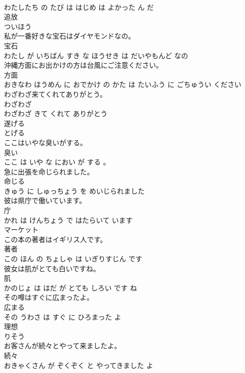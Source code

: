 \documentclass[8pt]{extreport}
\begin{document}
\begin{CJK}{UTF8}{min}
\\	わたしたち の たび は はじめ は よかった ん だ			
\\	追放	
\\	ついほう			
\\	私が一番好きな宝石はダイヤモンドなの。	
\\	宝石 
\\	わたし が いちばん すき な ほうせき は だいやもんど なの			
\\	沖縄方面にお出かけの方は台風にご注意ください。	
\\	方面 
\\	おきなわ ほうめん に おでかけ の かた は たいふう に ごちゅうい ください			
\\	わざわざ来てくれてありがとう。	
\\	わざわざ 
\\	わざわざ きて くれて ありがとう			
\\	遂げる	
\\	とげる			
\\	ここはいやな臭いがする。	
\\	臭い 
\\	ここ は いや な におい が する 。			
\\	急に出張を命じられました。	
\\	命じる 
\\	きゅう に しゅっちょう を めいじられました			
\\	彼は県庁で働いています。	
\\	庁 
\\	かれ は けんちょう で はたらいて います			
\\	マーケット	
\\	この本の著者はイギリス人です。	
\\	著者 
\\	この ほん の ちょしゃ は いぎりすじん です			
\\	彼女は肌がとても白いですね。	
\\	肌 
\\	かのじょ は はだ が とても しろい です ね			
\\	その噂はすぐに広まったよ。	
\\	広まる 
\\	その うわさ は すぐ に ひろまった よ			
\\	理想	
\\	りそう			
\\	お客さんが続々とやって来ましたよ。	
\\	続々 
\\	おきゃくさん が ぞくぞく と やってきました よ			

\end{CJK}
\end{document}
